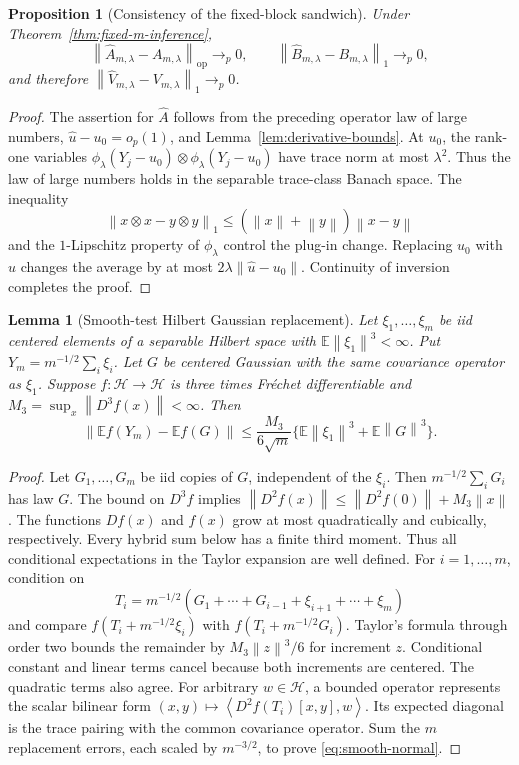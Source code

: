 \documentclass[twoside]{article}
\newtheorem{proposition}[theorem]{Proposition}
\newtheorem{lemma}[theorem]{Lemma}
\theoremstyle{definition}
\newcommand{\Hcal}{\mathcal H}
\newcommand{\E}{\mathbb E}
\newcommand{\norm}[1]{\left\lVert #1\right\rVert}
\newcommand{\ip}[2]{\left\langle #1,#2\right\rangle}
\newcommand{\op}{\mathrm{op}}
\begin{document}
\begin{proposition}[Consistency of the fixed-block sandwich]\label{prop:sandwich-consistency}
Under Theorem~\ref{thm:fixed-m-inference},
\[
    \norm{\hat A_{m,\lambda}-A_{m,\lambda}}_{\op}\to_p0,
    \qquad
    \norm{\hat B_{m,\lambda}-B_{m,\lambda}}_1\to_p0,
\]
and therefore $\norm{\hat V_{m,\lambda}-V_{m,\lambda}}_1\to_p0$.
\end{proposition}

\begin{proof}
The assertion for $\hat A$ follows from the preceding operator law of large numbers, $\hat u-u_0=o_p(1)$, and Lemma~\ref{lem:derivative-bounds}. At $u_0$, the rank-one variables $\phi_\lambda(Y_j-u_0)\otimes\phi_\lambda(Y_j-u_0)$ have trace norm at most $\lambda^2$. Thus the law of large numbers holds in the separable trace-class Banach space. The inequality
\[
\norm{x\otimes x-y\otimes y}_1
\le(\norm x+\norm y)\norm{x-y}
\]
and the $1$-Lipschitz property of $\phi_\lambda$ control the plug-in change. Replacing $u_0$ with $\hat u$ changes the average by at most $2\lambda\norm{\hat u-u_0}$. Continuity of inversion completes the proof.
\end{proof}

\begin{lemma}[Smooth-test Hilbert Gaussian replacement]\label{lem:smooth-normal}
Let $\xi_1,\ldots,\xi_m$ be iid centered elements of a separable Hilbert space with $\E\norm{\xi_1}^3<\infty$. Put $Y_m=m^{-1/2}\sum_i\xi_i$. Let $G$ be centered Gaussian with the same covariance operator as $\xi_1$. Suppose $f:\Hcal\to\Hcal$ is three times Fr\'echet differentiable and $M_3=\sup_x\norm{D^3f(x)}<\infty$. Then
\begin{equation}\label{eq:smooth-normal}
    \norm{\E f(Y_m)-\E f(G)}
    \le\frac{M_3}{6\sqrt m}
    \{\E\norm{\xi_1}^3+\E\norm G^3\}.
\end{equation}
\end{lemma}

\begin{proof}
Let $G_1,\ldots,G_m$ be iid copies of $G$, independent of the $\xi_i$. Then $m^{-1/2}\sum_iG_i$ has law $G$. The bound on $D^3f$ implies $\norm{D^2f(x)}\le\norm{D^2f(0)}+M_3\norm x$. The functions $Df(x)$ and $f(x)$ grow at most quadratically and cubically, respectively. Every hybrid sum below has a finite third moment. Thus all conditional expectations in the Taylor expansion are well defined. For $i=1,\ldots,m$, condition on
\[
T_i=m^{-1/2}(G_1+\cdots+G_{i-1}+\xi_{i+1}+\cdots+\xi_m)
\]
and compare $f(T_i+m^{-1/2}\xi_i)$ with $f(T_i+m^{-1/2}G_i)$. Taylor's formula through order two bounds the remainder by $M_3\norm z^3/6$ for increment $z$. Conditional constant and linear terms cancel because both increments are centered. The quadratic terms also agree. For arbitrary $w\in\Hcal$, a bounded operator represents the scalar bilinear form $(x,y)\mapsto\ip{D^2f(T_i)[x,y]}{w}$. Its expected diagonal is the trace pairing with the common covariance operator. Sum the $m$ replacement errors, each scaled by $m^{-3/2}$, to prove \eqref{eq:smooth-normal}.
\end{proof}
\end{document}
